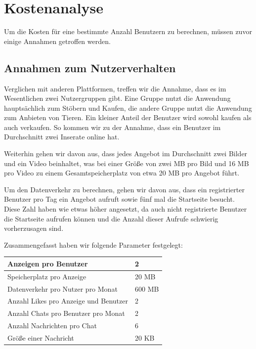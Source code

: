 \documentclass{article}
\begin{document}

\section{Kostenanalyse} %

Um die Kosten für eine bestimmte Anzahl Benutzern zu berechnen, müssen zuvor einige Annahmen getroffen werden.

\subsection{Annahmen zum Nutzerverhalten}
Verglichen mit anderen Plattformen, treffen wir die Annahme, dass es im Wesentlichen zwei Nutzergruppen gibt. Eine Gruppe nutzt die Anwendung hauptsächlich zum Stöbern und Kaufen, die andere Gruppe nutzt die Anwendung zum Anbieten von Tieren. Ein kleiner Anteil der Benutzer wird sowohl kaufen als auch verkaufen. So kommen wir zu der Annahme, dass ein Benutzer im Durchschnitt zwei Inserate online hat. 

Weiterhin gehen wir davon aus, dass jedes Angebot im Durchschnitt zwei Bilder und ein Video beinhaltet, was bei einer Größe von zwei MB pro Bild und 16 MB pro Video zu einem Gesamtspeicherplatz von etwa 20 MB pro Angebot führt.

Um den Datenverkehr zu berechnen, gehen wir davon aus, dass ein registrierter Benutzer pro Tag ein Angebot aufruft sowie fünf mal die Startseite besucht. Diese Zahl haben wie etwas höher angesetzt, da auch nicht registrierte Benutzer die Startseite aufrufen können und die Anzahl dieser Aufrufe schwierig vorherzusagen sind.

Zusammengefasst haben wir folgende Parameter festgelegt:

\begin{center}\label{tab:Parameters}
\begin{tabular}{|l|l|}
    \hline
    Anzeigen pro Benutzer & 2 \\ \hline
    Speicherplatz pro Anzeige & 20 MB \\ \hline
    Datenverkehr pro Nutzer pro Monat & 600 MB \\ \hline
    Anzahl Likes pro Anzeige und Benutzer & 2 \\ \hline
    Anzahl Chats pro Benutzer pro Monat & 2 \\\hline
    Anzahl Nachrichten pro Chat & 6 \\\hline
    Größe einer Nachricht & 20 KB \\ \hline
\end{tabular}    
\end{center}
\end{document}
